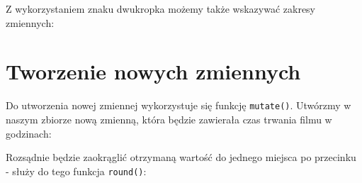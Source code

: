 \documentclass[]{book}
\newenvironment{Shaded}{\begin{snugshade}}{\end{snugshade}}
\newcommand{\KeywordTok}[1]{\textcolor[rgb]{0.13,0.29,0.53}{\textbf{#1}}}
\newcommand{\DataTypeTok}[1]{\textcolor[rgb]{0.13,0.29,0.53}{#1}}
\newcommand{\DecValTok}[1]{\textcolor[rgb]{0.00,0.00,0.81}{#1}}
\newcommand{\StringTok}[1]{\textcolor[rgb]{0.31,0.60,0.02}{#1}}
\newcommand{\OperatorTok}[1]{\textcolor[rgb]{0.81,0.36,0.00}{\textbf{#1}}}
\newcommand{\NormalTok}[1]{#1}
\begin{document}
Z wykorzystaniem znaku dwukropka możemy także wskazywać zakresy
zmiennych:

\begin{Shaded}
\end{Shaded}

\section{Tworzenie nowych zmiennych}\label{tworzenie-nowych-zmiennych}

Do utworzenia nowej zmiennej wykorzystuje się funkcję \texttt{mutate()}.
Utwórzmy w naszym zbiorze nową zmienną, która będzie zawierała czas
trwania filmu w godzinach:

\begin{Shaded}
\end{Shaded}

Rozsądnie będzie zaokrąglić otrzymaną wartość do jednego miejsca po
przecinku - służy do tego funkcja \texttt{round()}:

\begin{Shaded}
\end{Shaded}
\end{document}
